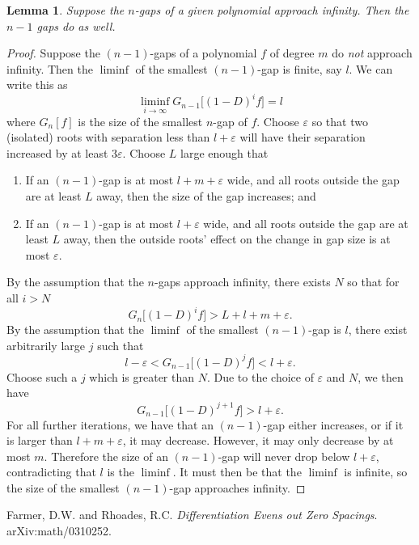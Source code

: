 \documentclass[11pt]{article}
\newcommand{\e}{\varepsilon}
\newtheorem{lemma}[theorem]{Lemma}
\begin{document}
\begin{lemma}
	Suppose the $n$-gaps of a given polynomial approach infinity. Then the $n-1$ gaps do as well.
\end{lemma}
\begin{proof}
	Suppose the $(n-1)$-gaps of a polynomial $f$ of degree $m$ do \emph{not} approach infinity. Then the $\liminf$ of the smallest $(n-1)$-gap is finite, say $l$. We can write this as
		\[ \liminf_{i\to\infty} G_{n-1}\big[(1-D)^i f\big] = l \]
	where $G_n[f]$ is the size of the smallest $n$-gap of $f$. Choose $\e$ so that two (isolated) roots with separation less than $l+\e$ will have their separation increased by at least $3\e$. Choose $L$ large enough that
	\begin{enumerate}
		\item If an $(n-1)$-gap is at most $l+m+\e$ wide, and all roots outside the gap are at least $L$ away, then the size of the gap increases; and
		\item If an $(n-1)$-gap is at most $l+\e$ wide, and all roots outside the gap are at least $L$ away, then the outside roots' effect on the change in gap size is at most $\e$.
	\end{enumerate}
	By the assumption that the $n$-gaps approach infinity, there exists $N$ so that for all $i>N$
		\[ G_n\big[(1-D)^i f\big] > L + l + m + \e. \]
	By the assumption that the $\liminf$ of the smallest $(n-1)$-gap is $l$, there exist arbitrarily large $j$ such that 
		\[ l-\e < G_{n-1}\big[ (1-D)^j f\big] < l+\e. \]
	Choose such a $j$ which is greater than $N$. Due to the choice of $\e$ and $N$, we then have
		\[ G_{n-1}\big[ (1-D)^{j+1} f\big] > l+\e. \]
	For all further iterations, we have that an $(n-1)$-gap either increases, or if it is larger than $l+m+\e$, it may decrease. However, it may only decrease by at most $m$. Therefore the size of an $(n-1)$-gap will never drop below $l+\e$, contradicting that $l$ is the $\liminf$. It must then be that the $\liminf$ is infinite, so the size of the smallest $(n-1)$-gap approaches infinity.
\end{proof}

\begin{thebibliography}{9}
 Farmer, D.W. and Rhoades, R.C.
 \emph{Differentiation Evens out Zero Spacings}.
 arXiv:math/0310252.

\end{thebibliography}
\end{document}
